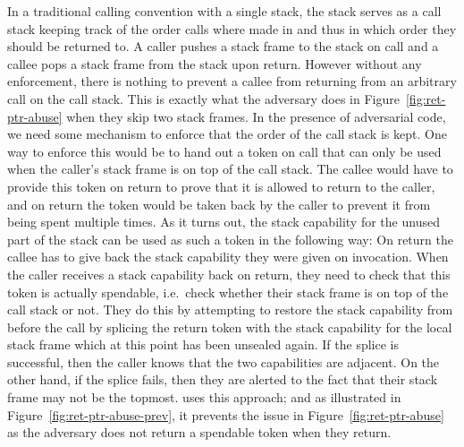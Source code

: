 \documentclass[acmsmall,screen]{acmart}\settopmatter{}
\begin{document}
In a traditional calling convention with a single stack, the stack serves as a call stack keeping track of the order calls where made in and thus in which order they should be returned to.
A caller pushes a stack frame to the stack on call and a callee pops a stack frame from the stack upon return.
However without any enforcement, there is nothing to prevent a callee from returning from an arbitrary call on the call stack.
This is exactly what the adversary does in Figure~\ref{fig:ret-ptr-abuse} when they skip two stack frames.
In the presence of adversarial code, we need some mechanism to enforce that the order of the call stack is kept.
One way to enforce this would be to hand out a token on call that can only be used when the caller's stack frame is on top of the call stack.
The callee would have to provide this token on return to prove that it is allowed to return to the caller, and on return the token would be taken back by the caller to prevent it from being spent multiple times.
As it turns out, the stack capability for the unused part of the stack can be used as such a token in the following way:
On return the callee has to give back the stack capability they were given on invocation.
When the caller receives a stack capability back on return, they need to check that this token is actually spendable, i.e.\ check whether their stack frame is on top of the call stack or not.
They do this by attempting to restore the stack capability from before the call by splicing the return token with the stack capability for the local stack frame which at this point has been unsealed again.
If the splice is successful, then the caller knows that the two capabilities are adjacent. On the other hand, if the splice fails, then they are alerted to the fact that their stack frame may not be the topmost.
\stktokens{} uses this approach; and as illustrated in Figure~\ref{fig:ret-ptr-abuse-prev}, it prevents the issue in Figure~\ref{fig:ret-ptr-abuse} as the adversary does not return a spendable token when they return.
\end{document}
